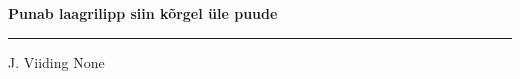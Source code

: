\documentclass[10pt]{book}
\begin{document}
{
  \samepage
  \raggedbottom
  \raggedright
  \sloppy


  \vspace{0.2in}

  \noindent\begin{minipage}{.1\textwidth}
    \hfill\vspace{0.1in}
  \end{minipage}%
  \noindent\begin{minipage}{.8\textwidth}
    \centering
    \bfseries
    \large Punab laagrilipp siin k\~orgel \"ule puude
  \end{minipage}%
  \noindent\begin{minipage}{.1\textwidth}
      \hfill\vspace{0.1in}
  \end{minipage}

  \nopagebreak[4]
  \vspace{0.1in}
  \nopagebreak[4]
  \hrule height 0.05ex
  \nopagebreak[4]
  \vspace{-0.05in}

  {\footnotesize J. Viiding \hfill None }\\
  \vspace{0.01in}



}
\end{document}
